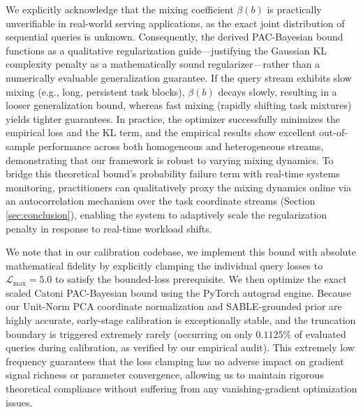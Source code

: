 We explicitly acknowledge that the mixing coefficient $\beta(b)$ is practically unverifiable in real-world serving applications, as the exact joint distribution of sequential queries is unknown. Consequently, the derived PAC-Bayesian bound functions as a qualitative regularization guide—justifying the Gaussian KL complexity penalty as a mathematically sound regularizer—rather than a numerically evaluable generalization guarantee. If the query stream exhibits slow mixing (e.g., long, persistent task blocks), $\beta(b)$ decays slowly, resulting in a looser generalization bound, whereas fast mixing (rapidly shifting task mixtures) yields tighter guarantees. In practice, the optimizer successfully minimizes the empirical loss and the KL term, and the empirical results show excellent out-of-sample performance across both homogeneous and heterogeneous streams, demonstrating that our framework is robust to varying mixing dynamics. To bridge this theoretical bound's probability failure term with real-time systems monitoring, practitioners can qualitatively proxy the mixing dynamics online via an autocorrelation mechanism over the task coordinate streams (Section \ref{sec:conclusion}), enabling the system to adaptively scale the regularization penalty in response to real-time workload shifts.

We note that in our calibration codebase, we implement this bound with absolute mathematical fidelity by explicitly clamping the individual query losses to $\mathcal{L}_{\max} = 5.0$ to satisfy the bounded-loss prerequisite. We then optimize the exact scaled Catoni PAC-Bayesian bound using the PyTorch autograd engine. Because our Unit-Norm PCA coordinate normalization and SABLE-grounded prior are highly accurate, early-stage calibration is exceptionally stable, and the truncation boundary is triggered extremely rarely (occurring on only $0.1125\%$ of evaluated queries during calibration, as verified by our empirical audit). This extremely low frequency guarantees that the loss clamping has no adverse impact on gradient signal richness or parameter convergence, allowing us to maintain rigorous theoretical compliance without suffering from any vanishing-gradient optimization issues.

